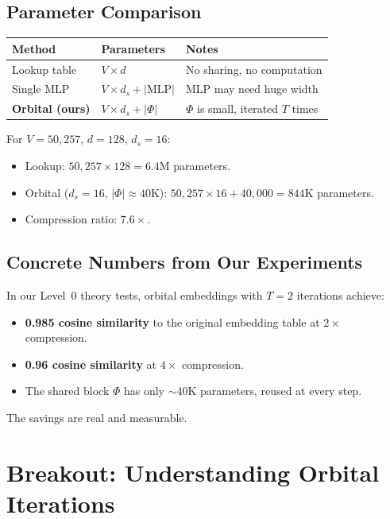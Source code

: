 \documentclass[11pt, a4paper]{article}
\theoremstyle{remark}
\begin{document}
\subsection{Parameter Comparison}

\begin{center}\small
\begin{tabular}{@{}p{3.5cm}p{4cm}p{4.5cm}@{}}
\toprule
\textbf{Method} & \textbf{Parameters} & \textbf{Notes} \\
\midrule
Lookup table & $V \times d$ & No sharing, no computation \\
Single MLP & $V \times d_s + |\text{MLP}|$ & MLP may need huge width \\
\textbf{Orbital (ours)} & $V \times d_s + |\Phi|$ & $\Phi$ is small, iterated $T$ times \\
\bottomrule
\end{tabular}
\end{center}

For $V = 50{,}257$, $d = 128$, $d_s = 16$:
\begin{itemize}[nosep]
    \item Lookup: $50{,}257 \times 128 = 6.4$M parameters.
    \item Orbital ($d_s = 16$, $|\Phi| \approx 40$K): $50{,}257 \times 16 + 40{,}000 = 844$K parameters.
    \item Compression ratio: $\mathbf{7.6\times}$.
\end{itemize}

\subsection{Concrete Numbers from Our Experiments}

In our Level~0 theory tests, orbital embeddings with $T = 2$ iterations achieve:
\begin{itemize}[nosep]
    \item \textbf{0.985 cosine similarity} to the original embedding table at $2\times$ compression.
    \item \textbf{0.96 cosine similarity} at $4\times$ compression.
    \item The shared block $\Phi$ has only $\sim$40K parameters, reused at every step.
\end{itemize}
The savings are real and measurable.


\section{Breakout: Understanding Orbital Iterations}
\label{sec:breakout-iterations}
\end{document}
